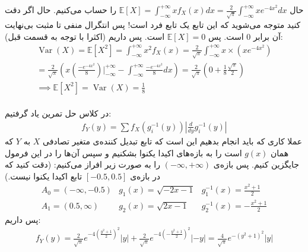 حال
$\mathbb{E}[X] = \int_{-\infty}^{+\infty} x f_X(x) dx = \frac{2}{\sqrt{\pi}} \int_{-\infty}^{+\infty} x e^{-4x^2} dx$
را حساب می‌کنیم.
حال اگر دقت کنید متوجه می‌شوید که این تابع یک تابع فرد است! پس انتگرال منفی تا مثبت بی‌نهایت آن برابر 0 است.
پس
$\mathbb{E}[X] = 0$
است. پس داریم (اکثرا با توجه به قسمت قبل):
\begin{gather*}
    \operatorname{Var}(X) = \mathbb{E}[X^2] = \int_{-\infty}^{+\infty} x^2 f_X(x)
    = \frac{2}{\sqrt{\pi}} \int_{-\infty}^{+\infty} x \times (x e^{-4x^2})\\
    = \frac{2}{\sqrt{\pi}} (x (\frac{-e^{-4x^2}}{8}) \big |_{-\infty}^{+\infty} - \int_{-\infty}^{+\infty} \frac{-e^{-4x^2}}{8} dx)
    = \frac{2}{\sqrt{\pi}} (0 + \frac{1}{8} \frac{\sqrt{\pi}}{2})\\
    \implies \mathbb{E}[X^2] = \operatorname{Var}(X) = \frac{1}{8}
\end{gather*}
\\
در کلاس حل تمرین یاد گرفتیم:
\begin{gather*}
    f_Y(y) = \sum f_X(g_i^{-1}(y)) |\frac{d}{dy} g_i^{-1}(y)|
\end{gather*}
عملا کاری که باید انجام بدهیم این است که تابع تبدیل کننده‌ی متغیر تصادفی
$X$ به $Y$
که همان
$g(x)$
است را به بازه‌های اکیدا یکنوا بشکنیم و سپس آن‌ها را در این فرمول جایگزین کنیم.
پس بازه‌ی
$(-\infty, +\infty)$
را به صورت زیر افراز می‌کنیم:
(دقت کنید که در بازه‌ی
$[-0.5, 0.5]$
تابع اکیدا یکنوا نیست.)
\[
    \begin{array}{lll}
       A_0 = (-\infty, -0.5) & g_1(x) = \sqrt{-2x - 1} & g_1^{-1}(x) = \frac{x^2 + 1}{2}\\
       A_1 = (0.5, \infty) & g_2(x) = \sqrt{2x - 1}  & g_2^{-1}(x) = -\frac{x^2 + 1}{2}
    \end{array}
\]
پس داریم:
\begin{gather*}
    f_Y(y) = \frac{2}{\sqrt{\pi}}e^{-4(\frac{y^2 + 1}{2})^2} |y|
    + \frac{2}{\sqrt{\pi}}e^{-4(-\frac{y^2 + 1}{2})^2} |-y|
    = \frac{4}{\sqrt{\pi}}e^{-(y^2 + 1)^2} |y|
\end{gather*}


